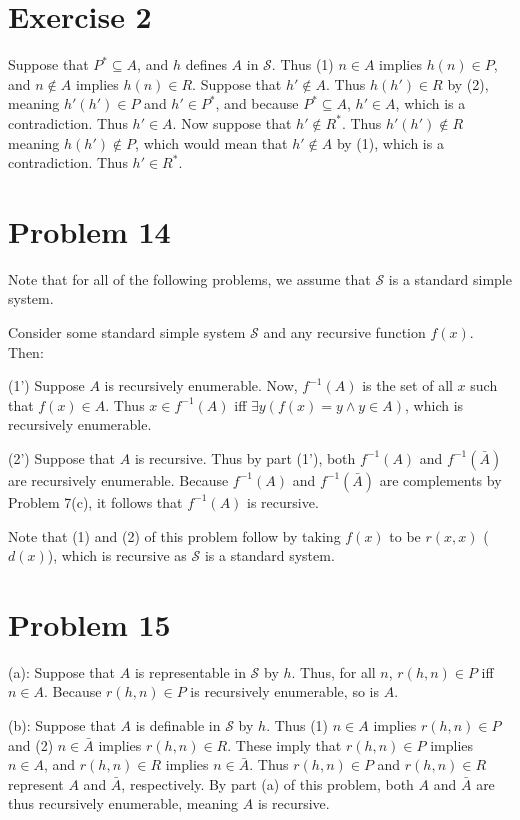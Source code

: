 \documentclass{article}
\theoremstyle{definition}
\begin{document}
\section*{Exercise 2}
Suppose that $P^*\subseteq A$, and $h$ defines $A$ in $\mathcal{S}$. Thus (1) $n\in A$ implies $h(n)\in P$, and $n\notin A$ implies $h(n)\in R$. Suppose that 
$h'\notin A$. Thus $h(h')\in R$ by (2), meaning $h'(h')\in P$ and $h'\in P^*$, and because $P^*\subseteq A$, $h'\in A$, which is a contradiction. Thus $h'\in A$. 
Now suppose that $h'\notin R^*$. Thus $h'(h')\notin R$ meaning $h(h')\notin P$, which would mean that $h'\notin A$ by (1), which is a contradiction. Thus $h'\in R^*$.

\section*{Problem 14}
Note that for all of the following problems, we assume that $\mathcal{S}$ is a standard simple system.

 
Consider some standard simple system $\mathcal{S}$ and any recursive function $f(x)$. Then:


(1') Suppose $A$ is recursively enumerable. Now, $f^{-1}(A)$ is the set of all $x$ such that $f(x)\in A$. Thus $x\in f^{-1}(A)$ iff $\exists y(f(x)=y\wedge y\in A)$, which is recursively 
enumerable.


(2') Suppose that $A$ is recursive. Thus by part (1'), both $f^{-1}(A)$ and $f^{-1}(\bar{A})$ are recursively enumerable. Because $f^{-1}(A)$ and $f^{-1}(\bar{A})$ are complements by 
Problem 7(c), it follows that $f^{-1}(A)$ is recursive.


Note that (1) and (2) of this problem follow by taking $f(x)$ to be $r(x,x)$ ($d(x)$), which is recursive as $\mathcal{S}$ is a standard system.

\section*{Problem 15}
(a): Suppose that $A$ is representable in $\mathcal{S}$ by $h$. Thus, for all $n$, $r(h,n)\in P$ iff $n\in A$. Because $r(h,n)\in P$ is recursively enumerable, so is $A$.


(b): Suppose that $A$ is definable in $\mathcal{S}$ by $h$. Thus (1) $n\in A$ implies $r(h,n)\in P$ and (2) $n\in\bar{A}$ implies $r(h,n)\in R$. These imply that 
$r(h,n)\in P$ implies $n\in A$, and $r(h,n)\in R$ implies $n\in\bar{A}$. Thus $r(h,n)\in P$ and $r(h,n)\in R$ represent $A$ and $\bar{A}$, respectively. By part (a) of this problem, 
both $A$ and $\bar{A}$ are thus recursively enumerable, meaning $A$ is recursive.
\end{document}
